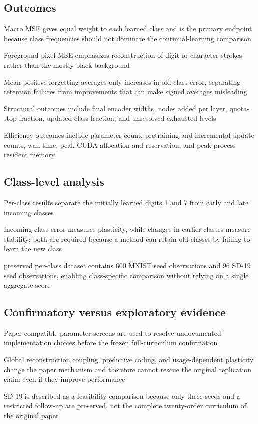 \subsection{Outcomes}
\begin{draftpoints}
  \item Macro MSE gives equal weight to each learned class and is the primary endpoint because class frequencies should not dominate the continual-learning comparison
  \item Foreground-pixel MSE emphasizes reconstruction of digit or character strokes rather than the mostly black background
  \item Mean positive forgetting averages only increases in old-class error, separating retention failures from improvements that can make signed averages misleading
  \item Structural outcomes include final encoder widths, nodes added per layer, quota-stop fraction, updated-class fraction, and unresolved exhausted levels
  \item Efficiency outcomes include parameter count, pretraining and incremental update counts, wall time, peak CUDA allocation and reservation, and peak process resident memory
\end{draftpoints}

\subsection{Class-level analysis}
\begin{draftpoints}
  \item Per-class results separate the initially learned digits 1 and 7 from early and late incoming classes
  \item Incoming-class error measures plasticity, while changes in earlier classes measure stability; both are required because a method can retain old classes by failing to learn the new class
  \item preserved per-class dataset contains 600 MNIST seed observations and 96 SD-19 seed observations, enabling class-specific comparison without relying on a single aggregate score
\end{draftpoints}

\subsection{Confirmatory versus exploratory evidence}
\begin{draftpoints}
  \item Paper-compatible parameter screens are used to resolve undocumented implementation choices before the frozen full-curriculum confirmation
  \item Global reconstruction coupling, predictive coding, and usage-dependent plasticity change the paper mechanism and therefore cannot rescue the original replication claim even if they improve performance
  \item SD-19 is described as a feasibility comparison because only three seeds and a restricted follow-up are preserved, not the complete twenty-order curriculum of the original paper
\end{draftpoints}

